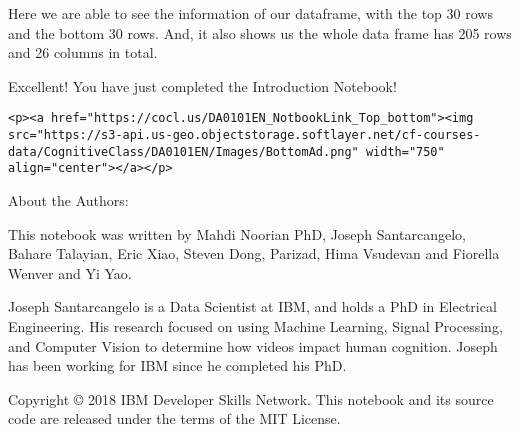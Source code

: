 \documentclass[11pt]{article}
\begin{document}
    Here we are able to see the information of our dataframe, with the top
30 rows and the bottom 30 rows. And, it also shows us the whole data
frame has 205 rows and 26 columns in total.

    Excellent! You have just completed the Introduction Notebook!

    \begin{verbatim}
<p><a href="https://cocl.us/DA0101EN_NotbookLink_Top_bottom"><img src="https://s3-api.us-geo.objectstorage.softlayer.net/cf-courses-data/CognitiveClass/DA0101EN/Images/BottomAd.png" width="750" align="center"></a></p>
\end{verbatim}

    About the Authors:

This notebook was written by Mahdi Noorian PhD, Joseph Santarcangelo,
Bahare Talayian, Eric Xiao, Steven Dong, Parizad, Hima Vsudevan and
Fiorella Wenver and Yi Yao.

Joseph Santarcangelo is a Data Scientist at IBM, and holds a PhD in
Electrical Engineering. His research focused on using Machine Learning,
Signal Processing, and Computer Vision to determine how videos impact
human cognition. Joseph has been working for IBM since he completed his
PhD.

    Copyright © 2018 IBM Developer Skills Network. This notebook and its
source code are released under the terms of the MIT License.


    
    
    
    
\end{document}
